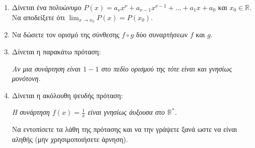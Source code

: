 \begin{enumerate}
\item Δίνεται ένα πολυώνυμο $ P(x)=a_\nu x^\nu+a_{\nu-1}x^{\nu-1}+\ldots+a_1x+a_0 $ και $ x_0\in\mathbb{R} $. Να αποδείξετε ότι $ {\displaystyle{\lim_{x\to x_0}{P(x)}=P(x_0)}} $.
\item Να δώσετε τον ορισμό της σύνθεσης $ f\circ g $ δύο συναρτήσεων $ f $ και $ g $.
\item Δίνεται η παρακάτω πρόταση:
\begin{center}
\textit{Αν μια συνάρτηση είναι $ 1-1 $ στο πεδίο ορισμού της τότε είναι και γνησίως μονότονη.}
\end{center}
\item Δίνεται η ακόλουθη ψευδής πρόταση:
\begin{center}
\textit{Η συνάρτηση $ f(x)=\frac{1}{x} $ είναι γνησίως άυξουσα στο $ \mathbb{R}^* $.}
\end{center}
Να εντοπίσετε τα λάθη της πρότασης και να την γράψετε ξανά ωστε να είναι αληθής (μην χρησιμοποιήσετε άρνηση).
\end{enumerate}
